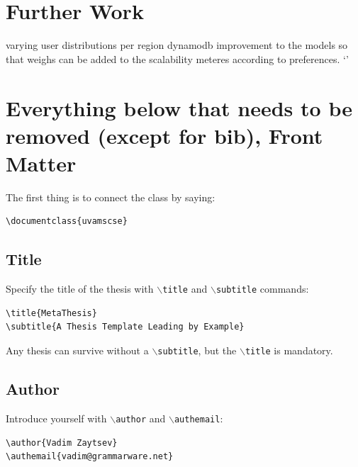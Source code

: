 \documentclass{uvamscse}
\newcommand{\cmd}[1]{\texttt{$\backslash$#1}}
\begin{document}
\chapter{Further Work}\label{Further Work}
varying user distributions per region
dynamodb
improvement to the models so that weighs can be added to the scalability meteres according to preferences.
`'
\chapter{Everything below that needs to be removed (except for bib), Front Matter}

The first thing is to connect the class by saying:

\begin{snippet}
\begin{verbatim}
\documentclass{uvamscse}
\end{verbatim}
\end{snippet}

\section{Title}

Specify the title of the thesis with \cmd{title} and \cmd{subtitle} commands:

\begin{snippet}
\begin{verbatim}
\title{MetaThesis}
\subtitle{A Thesis Template Leading by Example}
\end{verbatim}
\end{snippet}

Any thesis can survive without a \cmd{subtitle}, but the \cmd{title} is mandatory.

\section{Author}

Introduce yourself with \cmd{author} and \cmd{authemail}:

\begin{snippet}
\begin{verbatim}
\author{Vadim Zaytsev}
\authemail{vadim@grammarware.net}
\end{verbatim}
\end{snippet}
\end{document}
